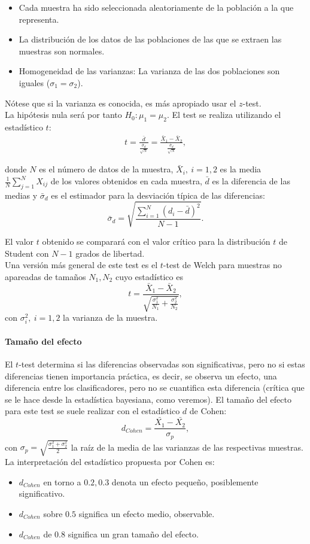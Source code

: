 	\begin{itemize}
	\item Cada muestra ha sido seleccionada aleatoriamente 
		de la población a la que representa.
	\item La distribución de los datos de las poblaciones de 
		las que se extraen las muestras son normales.
	\item Homogeneidad de las varianzas: La varianza de las 
		dos poblaciones son iguales ($\sigma_1 = \sigma_2$).
	\end{itemize}
	
	Nótese que si la varianza es conocida, es más apropiado 
usar el $z$-test.\\
	La hipótesis nula será por tanto $H_0: \mu_1 = \mu_2$.
El test se realiza utilizando el estadístico $t$:
\begin{align*}
	t 	= \frac{\bar{d}}
			{\frac{\bar{\sigma}_d}{\sqrt{N}}}
		= \frac{\bar{X}_1 - \bar{X}_2}
			{\frac{\bar{\sigma}_d}{\sqrt{N}}},
\end{align*}
	
	donde $N$ es el número de datos de la muestra, 
$\bar{X}_i,\ i=1,2$  es la media $\frac{1}{N}
\sum\limits_{j=1}^{N} X_{ij}$ de los  valores obtenidos en 
cada muestra, $\bar{d}$ es la diferencia de las medias y 
$\bar{\sigma}_d$ es el estimador para la desviación típica
de las diferencias:
	\[
		\bar{\sigma}_d =
			\sqrt{
			\frac{\sum\limits_{i=1}^{N} (d_i - \bar{d})^2}
				{N - 1}
			}.
	\]
	
	El valor $t$ obtenido se comparará con el valor crítico
para la distribución $t$ de Student con $N - 1$ 
grados de libertad.\\
	Una versión más general de este test es el $t$-test de
Welch para muestras no apareadas de tamaños $N_1, N_2$
cuyo estadístico es
	\[
		t = \frac{\bar{X}_1 - \bar{X}_2}
				{\sqrt{ \frac{\sigma_1^2}{N_1} +
						\frac{\sigma_2^2}{N_2}}},
	\]
	con $\sigma_i^2,\ i=1,2$ la varianza de la muestra.
	
\paragraph{Tamaño del efecto} El $t$-test determina si las 
diferencias observadas son significativas, pero no si 
estas diferencias tienen importancia práctica, es decir, 
se observa un efecto, una diferencia entre los 
clasificadores, pero no se cuantifica esta diferencia
(crítica que se le hace desde la estadística bayesiana,
como veremos). El tamaño del efecto para este test se
suele realizar con el estadístico $d$ de Cohen:
	\[
		d_{Cohen} = \frac{\bar{X_1}-\bar{X_2}}
					{\sigma_p},
	\]
	con $\sigma_p = \sqrt{\frac{\sigma_1^2 + \sigma_2^2}{2}}$
la raíz de la media de las varianzas de las respectivas muestras.
La interpretación del estadístico propuesta por Cohen es:
	\begin{itemize}
	\item $d_{Cohen}$ en torno a $0.2, 0.3$ denota un 
		efecto pequeño, posiblemente significativo.
	\item $d_{Cohen}$ sobre $0.5$ significa un efecto medio,
		observable.
	\item $d_{Cohen}$ de $0.8$ significa un gran tamaño del 
		efecto.
	\end{itemize}
	
